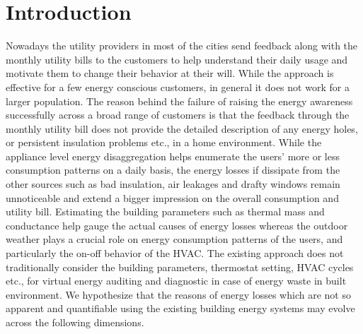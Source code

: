 \documentclass{sig-alternate}
\begin{document}
\section{Introduction}
Nowadays the utility providers in most of the cities send feedback along with the monthly utility bills to the customers to help understand their daily usage and motivate them to change their behavior at their will. While the approach is effective for a few energy conscious customers, in general it does not work for a larger population. The reason behind the failure of raising the energy awareness successfully across a broad range of customers is that the feedback through the monthly utility bill does not provide the detailed description of any energy holes, or persistent insulation problems etc., in a home environment. While the appliance level energy disaggregation helps enumerate the users' more or less consumption patterns on a daily basis, the energy losses if dissipate from the other sources such as bad insulation, air leakages and drafty windows remain unnoticeable and extend a bigger impression on the overall consumption and utility bill. Estimating the building parameters such as thermal mass and conductance help gauge the actual causes of energy losses whereas the outdoor weather plays a crucial role on energy consumption patterns of the users, and particularly the on-off behavior of the HVAC. The existing approach does not traditionally consider the building parameters, thermostat setting, HVAC cycles etc., for virtual energy auditing and diagnostic in case of energy waste in built environment. We hypothesize that the reasons of energy losses which are not so apparent and quantifiable using the existing building energy systems may evolve across the following dimensions.
\end{document}

